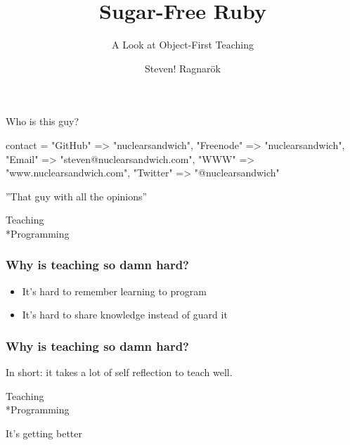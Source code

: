 \documentclass[20pt,aspectratio=169]{beamer}
\author{Steven! Ragnarök}
\title{Sugar-Free Ruby}
\subtitle{A Look at Object-First Teaching}
\begin{document}
\begin{frame}
\titlepage
\end{frame}

\begin{frame}[fragile]
\begin{center}
{Who is this guy?}
\vspace{1cm}\par
\insertauthor
\end{center}
\begin{ruby10pt}
contact = {
  "GitHub"   =>        "nuclearsandwich",
  "Freenode" =>        "nuclearsandwich",
  "Email"    => "steven@nuclearsandwich.com",
  "WWW"      =>    "www.nuclearsandwich.com",
  "Twitter"  =>       "@nuclearsandwich"
}
\end{ruby10pt}
\par\begin{center}
''That guy with all the opinions''
\end{center}
\end{frame}

{
\begin{frame}
\par { Teaching\\*Programming}\par
\vspace{3cm}\hfill
\end{frame}
}

\begin{frame}
\frametitle{Why is teaching so damn hard?}
\begin{itemize}
\pause\item It's hard to remember learning to program
\pause\item It's hard to share knowledge instead of guard it
\end{itemize}
\end{frame}

\begin{frame}
\frametitle{Why is teaching so damn hard?}

In short: it takes a lot of self reflection to teach well.
\end{frame}

{
\begin{frame}
\par { Teaching\\*Programming}\par
\vspace{3cm}\hfill
{It's getting better}
\end{frame}
}
\end{document}
